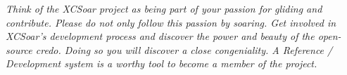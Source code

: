 \textsl{Think of the XCSoar project as being part of your passion for gliding and 
contribute. Please do not only follow this passion by soaring. Get involved in 
XCSoar's development process and discover the power and beauty of the open-source 
credo. 
Doing so you will discover a close congeniality. A Reference / Development system 
is a worthy tool to become a member of the project.}
